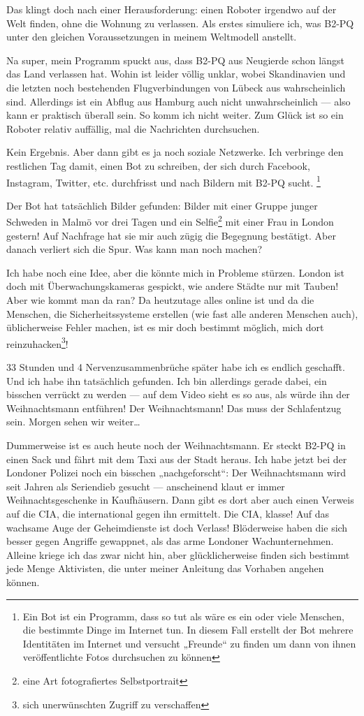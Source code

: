 Das klingt doch nach einer Herausforderung: einen Roboter irgendwo auf der Welt finden, ohne die Wohnung zu verlassen. Als erstes simuliere ich, was B2-PQ unter den gleichen Voraussetzungen in meinem Weltmodell anstellt.

Na super, mein Programm spuckt aus, dass B2-PQ aus Neugierde schon längst das Land verlassen hat. Wohin ist leider völlig unklar, wobei Skandinavien und die letzten noch bestehenden Flugverbindungen von Lübeck aus wahrscheinlich sind. Allerdings ist ein Abflug aus Hamburg auch nicht unwahrscheinlich — also kann er praktisch überall sein. So komm ich nicht weiter. Zum Glück ist so ein Roboter relativ auffällig, mal die Nachrichten durchsuchen.

Kein Ergebnis. Aber dann gibt es ja noch soziale Netzwerke. Ich verbringe den restlichen Tag damit, einen Bot zu schreiben, der sich durch Facebook, Instagram, Twitter, etc. durchfrisst und nach Bildern mit B2-PQ sucht.
\footnote{Ein Bot ist ein Programm, dass so tut als wäre es ein oder viele Menschen, die bestimmte Dinge im Internet tun. In diesem Fall erstellt der Bot mehrere Identitäten im Internet und versucht „Freunde“ zu finden um dann von ihnen veröffentlichte Fotos durchsuchen zu können}

Der Bot hat tatsächlich Bilder gefunden: Bilder mit einer Gruppe junger Schweden in Malmö vor drei Tagen und ein Selfie\footnote{eine Art fotografiertes Selbstportrait} mit einer Frau in London gestern! Auf Nachfrage hat sie mir auch zügig die Begegnung bestätigt. Aber danach verliert sich die Spur. Was kann man noch machen?

Ich habe noch eine Idee, aber die könnte mich in Probleme stürzen. London ist doch mit Überwachungskameras gespickt, wie andere Städte nur mit Tauben! Aber wie kommt man da ran? Da heutzutage alles online ist und da die Menschen, die Sicherheitssysteme erstellen (wie fast alle anderen Menschen auch), üblicherweise Fehler machen, ist es mir doch bestimmt möglich, mich dort reinzuhacken\footnote{sich unerwünschten Zugriff zu verschaffen}!

33 Stunden und 4 Nervenzusammenbrüche später habe ich es endlich geschafft. Und ich habe ihn tatsächlich gefunden. Ich bin allerdings gerade dabei, ein bisschen verrückt zu werden — auf dem Video sieht es so aus, als würde ihn der Weihnachtsmann entführen! Der Weihnachtsmann! Das muss der Schlafentzug sein. Morgen sehen wir weiter…

Dummerweise ist es auch heute noch der Weihnachtsmann. Er steckt B2-PQ in einen Sack und fährt mit dem Taxi aus der Stadt heraus. Ich habe jetzt bei der Londoner Polizei noch ein bisschen „nachgeforscht“: Der Weihnachtsmann wird seit Jahren als Seriendieb gesucht — anscheinend klaut er immer Weihnachtsgeschenke in Kaufhäusern. Dann gibt es dort aber auch einen Verweis auf die CIA, die international gegen ihn ermittelt. Die CIA, klasse! Auf das wachsame Auge der Geheimdienste ist doch Verlass! Blöderweise haben die sich besser gegen Angriffe gewappnet, als das arme Londoner Wachunternehmen. Alleine kriege ich das zwar nicht hin, aber glücklicherweise finden sich bestimmt jede Menge Aktivisten, die unter meiner Anleitung das Vorhaben angehen können.

